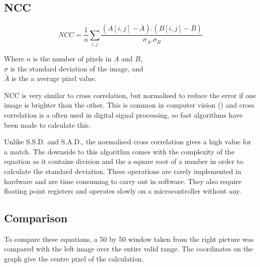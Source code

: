 \subsection{NCC}\label{Section:NCC}
\begin{equation}\label{eq:NCC}
NCC =  \frac{1}{n}\sum\limits_{i,j} \frac{(A[i,j] - \bar{A}).(B[i,j] - \bar{B})}{\sigma _A . \sigma _B}
\end{equation}
\begin{center}
Where $n$ is the number of pixels in $A$ and $B$, \\$\sigma$ is the standard deviation of the image, and \\$\bar{A}$ is the a average pixel value. 
\end{center}
NCC is very similar to cross correlation, but normalised to reduce the error if one image is brighter than the other. This is common in computer vision (\cite{Tsai:NCC}) and cross correlation is a often used in digital signal processing, so fast algorithms have been made to calculate this. 

Unlike S.S.D. and S.A.D., the normalised cross correlation gives a high value for a match. The downside to this algorithm comes with the complexity of the equation as it contains division and the a square root of a number in order to calculate the standard deviation. These operations are rarely implemented in hardware and are time consuming to carry out in software. They also require floating point registers and operates slowly on a microcontroller without any. 



\subsection{Comparison}

To compare these equations, a 50 by 50 window taken from the right picture was compared with the left image over the entire valid range. The coordinates on the graph give the centre pixel of the calculation. 


